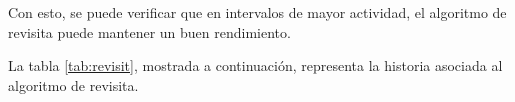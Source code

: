 Con esto, se puede verificar que en intervalos de mayor actividad, el algoritmo de revisita puede mantener un buen rendimiento.

La tabla \ref{tab:revisit}, mostrada a continuación, representa la historia asociada al algoritmo de revisita.



